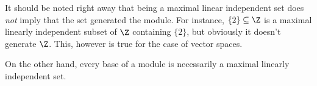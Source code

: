 \begin{remark}
\label{rem:maximality-not-generation}
It should be noted right away that being a maximal linear independent set does
\emph{not} imply that the set generated the module. For instance,
\(\{2\} \subseteq \Z\) is a maximal linearly independent subset of \(\Z\)
containing \(\{2\}\), but obviously it doesn't generate \(\Z\). This, however is
true for the case of vector spaces.

On the other hand, every base of a module is necessarily a maximal linearly
independent set.
\end{remark}

